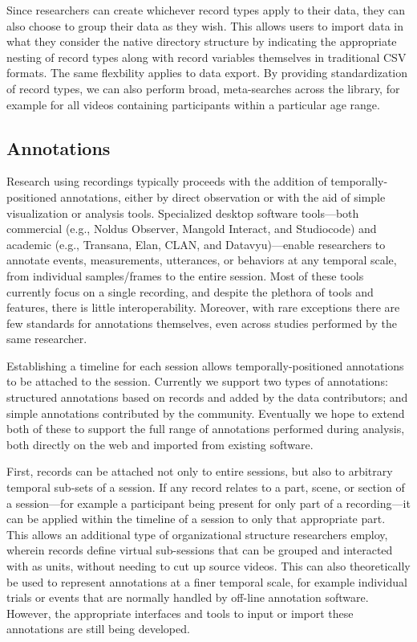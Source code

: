 \documentclass{sig-alternate}
\begin{document}
Since researchers can create whichever record types apply to their data, they can also choose to group their data as they wish.
This allows users to import data in what they consider the native directory structure by indicating the appropriate nesting of record types along with record variables themselves in traditional CSV formats.
The same flexbility applies to data export.
By providing standardization of record types, we can also perform broad, meta-searches across the library, for example for all videos containing participants within a particular age range.

\subsection{Annotations}


Research using recordings typically proceeds with the addition of temporally-positioned annotations, either by direct observation or with the aid of simple visualization or analysis tools.
Specialized desktop software tools---both commercial (e.g., Noldus Observer, Mangold Interact, and Studiocode) and academic (e.g., Transana, Elan, CLAN, and Datavyu)---enable researchers to annotate events, measurements, utterances, or behaviors at any temporal scale, from individual samples/frames to the entire session.
Most of these tools currently focus on a single recording, and despite the plethora of tools and features, there is little interoperability.
Moreover, with rare exceptions \cite{MacWhinney2001} there are few standards for annotations themselves, even across studies performed by the same researcher. 

Establishing a timeline for each session allows temporally-positioned annotations to be attached to the session.
Currently we support two types of annotations: structured annotations based on records and added by the data contributors; and simple annotations contributed by the community.
Eventually we hope to extend both of these to support the full range of annotations performed during analysis, both directly on the web and imported from existing software.

First, records can be attached not only to entire sessions, but also to arbitrary temporal sub-sets of a session.
If any record relates to a part, scene, or section of a session---for example a participant being present for only part of a recording---it can be applied within the timeline of a session to only that appropriate part.
This allows an additional type of organizational structure researchers employ, wherein records define virtual sub-sessions that can be grouped and interacted with as units, without needing to cut up source videos.
This can also theoretically be used to represent annotations at a finer temporal scale, for example individual trials or events that are normally handled by off-line annotation software.
However, the appropriate interfaces and tools to input or import these annotations are still being developed.
\end{document}
